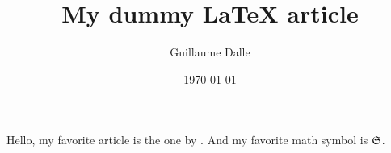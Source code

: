 \documentclass{article}
\title{My dummy LaTeX article}
\author{Guillaume Dalle}
\date{\today}
\begin{document}
\maketitle

Hello, my favorite article is the one by \textcite{dalleLearningCombinatorialOptimization2022}. And my favorite math symbol is $\mathfrak{S}$.

\printbibliography
\end{document}
